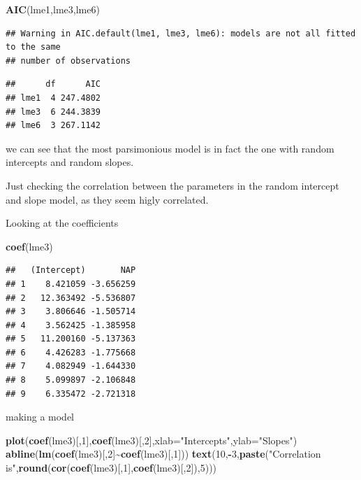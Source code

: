 \documentclass[
]{book}
\newenvironment{Shaded}{\begin{snugshade}}{\end{snugshade}}
\newcommand{\AttributeTok}[1]{\textcolor[rgb]{0.13,0.29,0.53}{#1}}
\newcommand{\DecValTok}[1]{\textcolor[rgb]{0.00,0.00,0.81}{#1}}
\newcommand{\FunctionTok}[1]{\textcolor[rgb]{0.13,0.29,0.53}{\textbf{#1}}}
\newcommand{\NormalTok}[1]{#1}
\newcommand{\SpecialCharTok}[1]{\textcolor[rgb]{0.81,0.36,0.00}{\textbf{#1}}}
\newcommand{\StringTok}[1]{\textcolor[rgb]{0.31,0.60,0.02}{#1}}
\begin{document}
\begin{Shaded}
\begin{Highlighting}[]
\FunctionTok{AIC}\NormalTok{(lme1,lme3,lme6)}
\end{Highlighting}
\end{Shaded}

\begin{verbatim}
## Warning in AIC.default(lme1, lme3, lme6): models are not all fitted to the same
## number of observations
\end{verbatim}

\begin{verbatim}
##      df      AIC
## lme1  4 247.4802
## lme3  6 244.3839
## lme6  3 267.1142
\end{verbatim}

we can see that the most parsimonious model is in fact the one with random intercepts and random slopes.

Just checking the correlation between the parameters in the random intercept and slope model, as they seem higly correlated.

Looking at the coefficients

\begin{Shaded}
\begin{Highlighting}[]
\FunctionTok{coef}\NormalTok{(lme3)}
\end{Highlighting}
\end{Shaded}

\begin{verbatim}
##   (Intercept)       NAP
## 1    8.421059 -3.656259
## 2   12.363492 -5.536807
## 3    3.806646 -1.505714
## 4    3.562425 -1.385958
## 5   11.200160 -5.137363
## 6    4.426283 -1.775668
## 7    4.082949 -1.644330
## 8    5.099897 -2.106848
## 9    6.335472 -2.721318
\end{verbatim}

making a model

\begin{Shaded}
\begin{Highlighting}[]
\FunctionTok{plot}\NormalTok{(}\FunctionTok{coef}\NormalTok{(lme3)[,}\DecValTok{1}\NormalTok{],}\FunctionTok{coef}\NormalTok{(lme3)[,}\DecValTok{2}\NormalTok{],}\AttributeTok{xlab=}\StringTok{"Intercepts"}\NormalTok{,}\AttributeTok{ylab=}\StringTok{"Slopes"}\NormalTok{)}
\FunctionTok{abline}\NormalTok{(}\FunctionTok{lm}\NormalTok{(}\FunctionTok{coef}\NormalTok{(lme3)[,}\DecValTok{2}\NormalTok{]}\SpecialCharTok{\textasciitilde{}}\FunctionTok{coef}\NormalTok{(lme3)[,}\DecValTok{1}\NormalTok{]))}
\FunctionTok{text}\NormalTok{(}\DecValTok{10}\NormalTok{,}\SpecialCharTok{{-}}\DecValTok{3}\NormalTok{,}\FunctionTok{paste}\NormalTok{(}\StringTok{"Correlation is"}\NormalTok{,}\FunctionTok{round}\NormalTok{(}\FunctionTok{cor}\NormalTok{(}\FunctionTok{coef}\NormalTok{(lme3)[,}\DecValTok{1}\NormalTok{],}\FunctionTok{coef}\NormalTok{(lme3)[,}\DecValTok{2}\NormalTok{]),}\DecValTok{5}\NormalTok{)))}
\end{Highlighting}
\end{Shaded}
\end{document}
